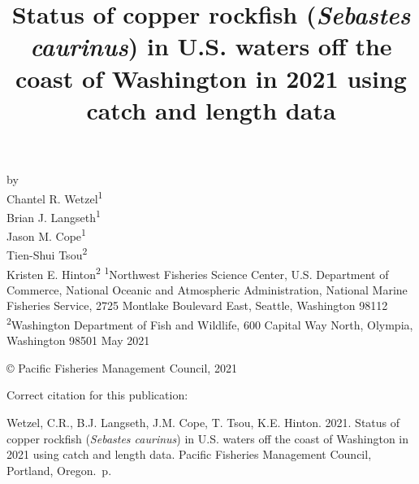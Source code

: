 \documentclass[11pt,
  english,
  a4paper,
]{article}
\date{}
\newcommand{\trTitle}{Status of copper rockfish (\emph{Sebastes caurinus}) in U.S. waters off the coast of Washington in 2021 using catch and length data}
\newcommand{\trYear}{2021}
\newcommand{\trMonth}{May}
\newcommand{\trAuthsBack}{Wetzel, C.R., B.J. Langseth, J.M. Cope, T. Tsou, K.E. Hinton}
\newcommand{\trCitation}{
\begin{hangparas}{1em}{1}
\trAuthsBack{}. \trYear{}. \trTitle{}. Pacific Fisheries Management Council, Portland, Oregon. \pageref{LastPage}{}\,p.
\end{hangparas}}
\begin{document}

\renewcommand*{\thefootnote}{\fnsymbol{footnote}}

\small
\thispagestyle{empty}
\noindent
\begin{center}
\title{Status of copper rockfish (\emph{Sebastes caurinus}) in U.S. waters off the coast of Washington in 2021 using catch and length data}
\vspace{1.5cm}
{\Large\textbf{}}
\vfill
by\\
Chantel R. Wetzel\textsuperscript{1}\\
Brian J. Langseth\textsuperscript{1}\\
Jason M. Cope\textsuperscript{1}\\
Tien-Shui Tsou\textsuperscript{2}\\
Kristen E. Hinton\textsuperscript{2}\vfill
\textsuperscript{1}Northwest Fisheries Science Center, U.S. Department of Commerce, National Oceanic and Atmospheric Administration, National Marine Fisheries Service, 2725 Montlake Boulevard East, Seattle, Washington 98112\\
\textsuperscript{2}Washington Department of Fish and Wildlife, 600 Capital Way North, Olympia, Washington 98501\vfill
\trMonth{} \trYear{}
\end{center}
\clearpage

\thispagestyle{empty}
\vspace*{\fill}
\begin{center}
\copyright{} Pacific Fisheries Management Council, \trYear{}\\
\end{center}
\par
\bigskip
\noindent
Correct citation for this publication:
\bigskip
\par
\trCitation{}
\clearpage


\tableofcontents\clearpage
\label{TRlastRoman}
\clearpage

\newpage
\thispagestyle{empty} %
\end{document}
